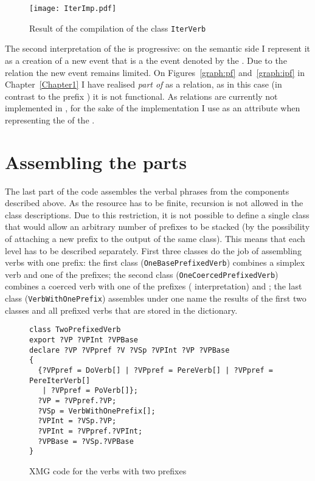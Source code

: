 \begin{sidewaysfigure}
\texttt{[image: IterImp.pdf]}
\caption{Result of the compilation of the class \texttt{IterVerb}\label{fig:iter}}
\end{sidewaysfigure}

The second interpretation of the  is progressive: on the semantic side I represent it as a creation of a new event that is a \PARTOF the event denoted by the . Due to the \PARTOF relation the new event remains limited. On Figures~\ref{graph:pf} and~\ref{graph:ipf} in Chapter~\ref{Chapter1} I have realised \textit{part of} as a relation, as in this case (in contrast to the prefix ) it is not functional. As relations are currently not implemented in , for the sake of the implementation I use \PARTOF as an attribute when representing the  of the .

\section{Assembling the parts}
The last part of the code assembles the verbal phrases from the components described above. As the resource has to be finite, recursion is not allowed in the  class descriptions.  Due to this restriction, it is not possible to define a single class that would allow an arbitrary number of prefixes to be stacked (by the possibility of attaching a new prefix to the output of the same class). This means that each  level has to be described separately. First three classes do the job of assembling verbs with one prefix: the first class (\texttt{OneBasePrefixedVerb}) combines a simplex verb and one of the prefixes; the second class (\texttt{OneCoercedPrefix\-edVerb}) combines a coerced verb with one of the prefixes  ( interpretation) and ; the last class (\texttt{VerbWithOnePrefix}) assembles under one name the results of the first two classes and all prefixed verbs that are stored in the dictionary. 

\begin{figure}
\begin{lstlisting}[style=xmg]
class TwoPrefixedVerb
export ?VP ?VPInt ?VPBase
declare ?VP ?VPpref ?V ?VSp ?VPInt ?VP ?VPBase
{
  {?VPpref = DoVerb[] | ?VPpref = PereVerb[] | ?VPpref = PereIterVerb[] 
   | ?VPpref = PoVerb[]};
  ?VP = ?VPpref.?VP;
  ?VSp = VerbWithOnePrefix[];
  ?VPInt = ?VSp.?VP;
  ?VPInt = ?VPpref.?VPInt;
  ?VPBase = ?VSp.?VPBase
}
\end{lstlisting}
\caption{XMG code for the verbs with two prefixes \label{xmg:2pref}}
\end{figure}


